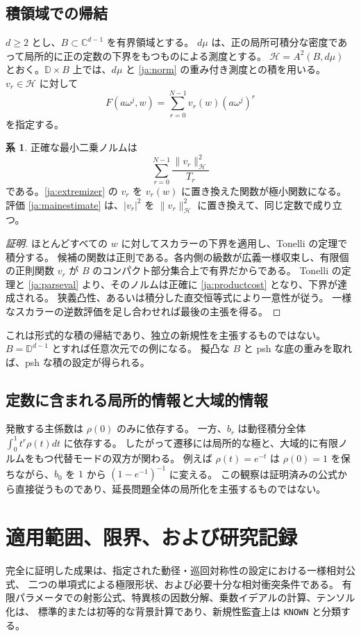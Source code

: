 \documentclass[12pt]{amsart}
\theoremstyle{definition}
\theoremstyle{remark}
\numberwithin{equation}{section}
\newcommand{\cH}{\mathcal{H}}
\newcommand{\C}{\mathbb{C}}
\newcommand{\D}{\mathbb{D}}
\theoremstyle{definition}
\newtheorem{jcor}[thm]{系}
\begin{document}
\subsection{積領域での帰結}
$d\ge2$ とし、$B\subset\C^{d-1}$ を有界領域とする。
$d\mu$ は、正の局所可積分な密度であって局所的に正の定数の下界をもつものによる測度とする。
$\cH=A^2(B,d\mu)$ とおく。$\D\times B$ 上では、$d\mu$ と \eqref{ja:norm} の重み付き測度との積を用いる。
$v_r\in\cH$ に対して
\[
 F(a\omega^j,w)=\sum_{r=0}^{N-1}v_r(w)(a\omega^j)^r
\]
を指定する。
\begin{jcor}\label{ja:product}
正確な最小二乗ノルムは
\begin{equation}\label{ja:productcost}
 \sum_{r=0}^{N-1}\frac{\|v_r\|_{\cH}^2}{T_r}
\end{equation}
である。\eqref{ja:extremizer} の $v_r$ を $v_r(w)$ に置き換えた関数が極小関数になる。
評価 \eqref{ja:mainestimate} は、$|v_r|^2$ を $\|v_r\|_{\cH}^2$ に置き換えて、同じ定数で成り立つ。
\end{jcor}
\begin{proof}[証明]
ほとんどすべての $w$ に対してスカラーの下界を適用し、Tonelli の定理で積分する。
候補の関数は正則である。各内側の級数が広義一様収束し、有限個の正則関数 $v_r$ が
$B$ のコンパクト部分集合上で有界だからである。
Tonelli の定理と \eqref{ja:parseval} より、そのノルムは正確に \eqref{ja:productcost} となり、下界が達成される。
狭義凸性、あるいは積分した直交恒等式により一意性が従う。
一様なスカラーの逆数評価を足し合わせれば最後の主張を得る。
\end{proof}
これは形式的な積の帰結であり、独立の新規性を主張するものではない。
$B=\D^{d-1}$ とすれば任意次元での例になる。
擬凸な $B$ と psh な底の重みを取れば、psh な積の設定が得られる。

\subsection{定数に含まれる局所的情報と大域的情報}
発散する主係数は $\rho(0)$ のみに依存する。
一方、$b_r$ は動径積分全体 $\int_0^1t^r\rho(t)dt$ に依存する。
したがって遷移には局所的な極と、大域的に有限ノルムをもつ代替モードの双方が関わる。
例えば $\rho(t)=e^{-t}$ は $\rho(0)=1$ を保ちながら、$b_0$ を $1$ から $(1-e^{-1})^{-1}$ に変える。
この観察は証明済みの公式から直接従うものであり、延長問題全体の局所化を主張するものではない。

\section{適用範囲、限界、および研究記録}
完全に証明した成果は、指定された動径・巡回対称性の設定における一様相対公式、
二つの単項式による極限形状、および必要十分な相対衝突条件である。
有限パラメータでの射影公式、特異核の因数分解、乗数イデアルの計算、テンソル化は、
標準的または初等的な背景計算であり、新規性監査上は \texttt{KNOWN} と分類する。
\end{document}
